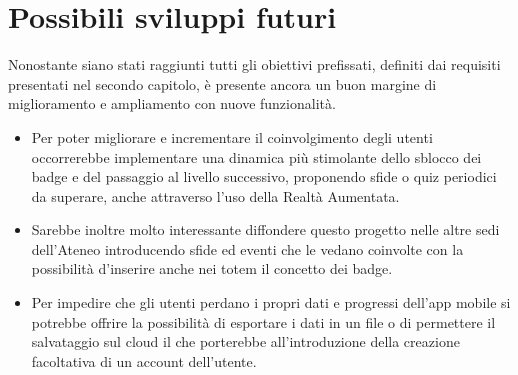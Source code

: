 \section{Possibili sviluppi futuri}
Nonostante siano stati raggiunti tutti gli obiettivi prefissati, definiti dai requisiti presentati nel secondo capitolo, è presente ancora un buon margine di miglioramento e ampliamento con nuove funzionalità.
\begin{itemize}
    \itemsep1em
    \item Per poter migliorare e incrementare il coinvolgimento degli utenti occorrerebbe implementare una dinamica più stimolante dello sblocco dei badge e del passaggio al livello successivo, proponendo sfide o quiz periodici da superare, anche attraverso l'uso della Realtà Aumentata.
    \item Sarebbe inoltre molto interessante diffondere questo progetto nelle altre sedi dell'Ateneo introducendo sfide ed eventi che le vedano coinvolte con la possibilità d'inserire anche nei totem il concetto dei badge.
    \item Per impedire che gli utenti perdano i propri dati e progressi dell'app mobile si potrebbe offrire la possibilità di esportare i dati in un file o di permettere il salvataggio sul cloud il che porterebbe all'introduzione della creazione facoltativa di un account dell'utente.
\end{itemize}




